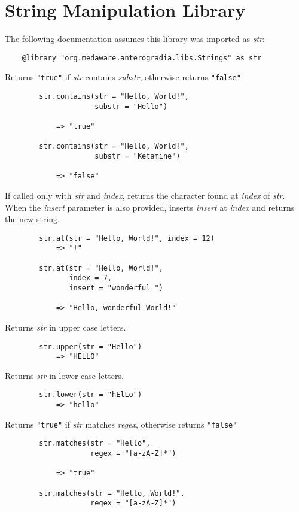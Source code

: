 \section{String Manipulation Library}
\vspace{1.5mm}
The following documentation assumes this library was imported as \textit{str}:
\begin{verbatim}
	@library "org.medaware.anterogradia.libs.Strings" as str
\end{verbatim}
\begin{multicols*}{2}
	Returns \verb|"true"| if \textit{str} contains \textit{substr}, otherwise returns \verb|"false"|
	\begin{verbatim}
		str.contains(str = "Hello, World!",
		             substr = "Hello")

		    => "true"

		str.contains(str = "Hello, World!",
		             substr = "Ketamine")

		    => "false"
	\end{verbatim}
	If called only with \textit{str} and \textit{index}, returns the character found at \textit{index} of \textit{str}.
	When the \textit{insert} parameter is also provided, inserts \textit{insert} at \textit{index} and returns the
	new string.
	\begin{verbatim}
		str.at(str = "Hello, World!", index = 12)
		    => "!"

		str.at(str = "Hello, World!",
		       index = 7,
		       insert = "wonderful ")

		    => "Hello, wonderful World!"
	\end{verbatim}
	Returns \textit{str} in upper case letters.
	\begin{verbatim}
		str.upper(str = "Hello")
		    => "HELLO"
	\end{verbatim}
	Returns \textit{str} in lower case letters.
	\begin{verbatim}
		str.lower(str = "hElLo")
		    => "hello"
	\end{verbatim}
	Returns \verb|"true"| if \textit{str} matches \textit{regex}, otherwise returns \verb|"false"|
	\begin{verbatim}
		str.matches(str = "Hello",
		            regex = "[a-zA-Z]*")

		    => "true"

		str.matches(str = "Hello, World!",
		            regex = "[a-zA-Z]*")


\end{verbatim}
\end{multicols*}
